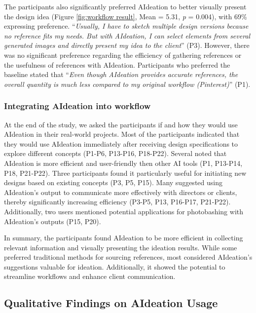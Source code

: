 The participants also significantly preferred AIdeation to better visually present the design idea (Figure \ref{fig:workflow result}, Mean = 5.31, \textit{p} = 0.004), with 69\% expressing preference. “\textit{Usually, I have to sketch multiple design versions because no reference fits my needs. But with AIdeation, I can select elements from several generated images and directly present my idea to the client}” (P3).
However, there was no significant preference regarding the efficiency of gathering references or the usefulness of references with AIdeation. Participants who preferred the baseline stated that “\textit{Even though AIdeation provides accurate references, the overall quantity is much less compared to my original workflow (Pinterest)}” (P1).


\subsubsection{Integrating AIdeation into workflow}
At the end of the study, we asked the participants if and how they would use AIdeation in their real-world projects. Most of the participants indicated that they would use AIdeation immediately after receiving design specifications to explore different concepts (P1-P6, P13-P16, P18-P22). Several noted that AIdeation is more efficient and user-friendly then other AI tools (P1, P13-P14, P18, P21-P22). Three participants found it particularly useful for initiating new designs based on existing concepts (P3, P5, P15). Many suggested using AIdeation's output to communicate more effectively with directors or clients, thereby significantly increasing efficiency (P3-P5, P13, P16-P17, P21-P22). Additionally, two users mentioned potential applications for photobashing with AIdeation's outputs (P15, P20).

In summary, the participants found AIdeation to be more efficient in collecting relevant information and visually presenting the ideation results. While some preferred traditional methods for sourcing references, most considered AIdeation's suggestions valuable for ideation. Additionally, it showed the potential to streamline workflows and enhance client communication.

\subsection{Qualitative Findings on AIdeation Usage}
